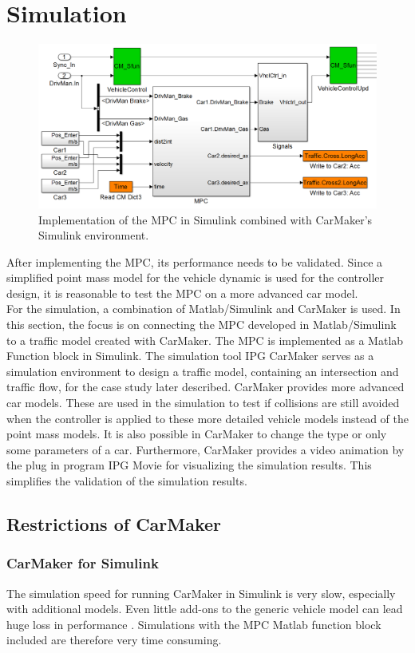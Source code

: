 \documentclass[letterpaper,10pt,conference]{ieeeconf}
\begin{document}
\section{Simulation}
\begin{figure}[]
    \centering
    \includegraphics[width=1.8\columnwidth]{CarMaker_Implement2.png}
    \caption{Implementation of the MPC in Simulink combined with CarMaker's Simulink environment.}
    \label{fig:CM_Implement}
\end{figure}
After implementing the MPC, its performance needs to be validated. Since a simplified point mass model for the vehicle dynamic is used for the controller design, it is reasonable to test the MPC on a more advanced car model.\\ \indent
For the simulation, a combination of Matlab/Simulink and CarMaker is used. In this section, the focus is on connecting the MPC developed in Matlab/Simulink to a traffic model created with CarMaker. The MPC is implemented as a Matlab Function block in Simulink. The simulation tool IPG CarMaker serves as a simulation environment to design a traffic model, containing an intersection and traffic flow, for the case study later described. CarMaker provides more advanced car models. These are used in the simulation to test if collisions are still avoided when the controller is applied to these more detailed vehicle models instead of the point mass models. It is also possible in CarMaker to change the type or only some parameters of a car. Furthermore, CarMaker provides a video animation by the plug in program IPG Movie for visualizing the simulation results. This simplifies the validation of the simulation results.
\subsection{Restrictions of CarMaker}
\subsubsection{CarMaker for Simulink}
The simulation speed for running CarMaker in Simulink is very slow, especially with additional models. Even little add-ons to the generic vehicle model can lead huge loss in performance \cite{qsguide}. Simulations with the MPC Matlab function block included are therefore very time consuming.
\end{document}
